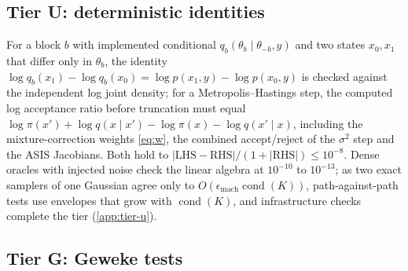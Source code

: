 \subsection{Tier U: deterministic identities}\label{sec:validation-u}

For a block $b$ with implemented conditional $q_b(\theta_b \mid \theta_{-b}, y)$ and two states
$x_0, x_1$ that differ only in $\theta_b$, the identity \citep{grosse2014testing}
$\log q_b(x_1) - \log q_b(x_0) = \log p(x_1, y) - \log p(x_0, y)$ is checked against the
independent log joint density; for a Metropolis--Hastings step, the computed
log acceptance ratio before truncation must equal
$\log\pi(x') + \log q(x \mid x') - \log\pi(x) - \log q(x' \mid x)$, including the mixture-correction
weights \eqref{eq:w}, the combined accept/reject of the $\sigma^2$ step and the ASIS Jacobians. Both
hold to $|\mathrm{LHS} - \mathrm{RHS}|/(1 + |\mathrm{RHS}|) \le 10^{-8}$. %
Dense oracles with injected noise check the linear algebra at $10^{-10}$ to $10^{-13}$; %
as two exact samplers of one Gaussian agree only to $O(\epsilon_{\mathrm{mach}}\operatorname{cond}(K))$,
path-against-path tests use envelopes that grow with $\operatorname{cond}(K)$, and infrastructure
checks complete the tier (\cref{app:tier-u}). %

\subsection{Tier G: Geweke tests}\label{sec:validation-geweke}

